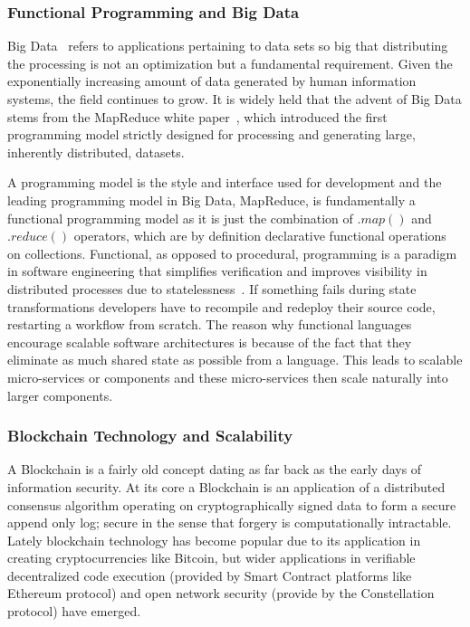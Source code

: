 \documentclass[runningheads]{llncs}
\begin{document}
\subsubsection{Functional Programming and Big Data}
Big Data~\cite{ref_article11,ref_book2} refers to applications pertaining to data sets so big that distributing the processing is not an optimization but a fundamental requirement. Given the exponentially increasing amount of data generated by human information systems, the field continues to grow. It is widely held that the advent of Big Data stems from the MapReduce white paper~\cite{ref_proc1}, which introduced the first programming model strictly designed for processing and generating large, inherently distributed, datasets. 

A programming model is the style and interface used for development and the leading programming model in Big Data, MapReduce, is fundamentally a functional programming model as it is just the combination of $.map()$ and $.reduce()$ operators, which are by definition declarative functional operations on collections. Functional, as opposed to procedural, programming is a paradigm in software engineering that simplifies verification and improves visibility in distributed processes due to statelessness~\cite{ref_book3}. If something fails during state transformations developers have to recompile and redeploy their source code, restarting a workflow from scratch. The reason why functional languages encourage scalable software architectures is because of the fact that they eliminate as much shared state as possible from a language. This leads to scalable micro-services or components and these micro-services then scale naturally into larger components.

\subsubsection{Blockchain Technology and Scalability}
A Blockchain is a fairly old concept dating as far back as the early days of information security. At its core a Blockchain is an application of a distributed consensus algorithm operating on cryptographically signed data to form a secure append only log; secure in the sense that forgery is computationally intractable. Lately blockchain technology has become popular due to its application in creating cryptocurrencies like Bitcoin, but wider applications in verifiable decentralized code execution (provided by Smart Contract platforms like Ethereum protocol) and open network security (provide by the Constellation protocol) have emerged. 
\end{document}
